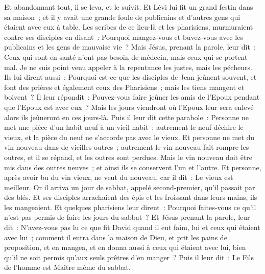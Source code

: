 \begin{multicols}{2}
Et abandonnant tout, il se leva, et le suivit.
Et Lévi lui fit un grand festin dans sa maison~; et il y avait une grande foule de publicains et d'autres gens qui étaient avec eux à table.
Les scribes de ce lieu-là et les pharisiens, murmuraient contre ses disciples en disant~: Pourquoi mangez-vous et buvez-vous avec les publicains et les gens de mauvaise vie~?
Mais Jésus, prenant la parole, leur dit~: Ceux qui sont en santé n'ont pas besoin de médecin, mais ceux qui se portent mal.
Je ne suis point venu appeler à la repentance les justes, mais les pécheurs.
Ils lui dirent aussi~: Pourquoi est-ce que les disciples de Jean jeûnent souvent, et font des prières et également ceux des Pharisiens~; mais les tiens mangent et boivent~?
Il leur répondit~: Pouvez-vous faire jeûner les amis de l'Epoux pendant que l'Epoux est avec eux~?
Mais les jours viendront où l'Epoux leur sera enlevé alors ils jeûneront en ces jours-là.
Puis il leur dit cette parabole~: Personne ne met une pièce d'un habit neuf à un vieil habit~; autrement le neuf déchire le vieux, et la pièce du neuf ne s'accorde pas avec le vieux.
Et personne ne met du vin nouveau dans de vieilles outres~; autrement le vin nouveau fait rompre les outres, et il se répand, et les outres sont perdues.
Mais le vin nouveau doit être mis dans des outres neuves~; et ainsi ils se conservent l'un et l'autre.
Et personne, après avoir bu du vin vieux, ne veut du nouveau, car il dit~: Le vieux est meilleur.
\VerseOne{}Or il arriva un jour de sabbat, appelé second-premier, qu'il passait par des blés. Et ses disciples arrachaient des épis et les froissant dans leurs mains, ils les mangeaient.
Et quelques pharisiens leur dirent~: Pourquoi faites-vous ce qu'il n'est pas permis de faire les jours du sabbat~?
Et Jésus prenant la parole, leur dit~: N'avez-vous pas lu ce que fit David quand il eut faim, lui et ceux qui étaient avec lui~;
comment il entra dans la maison de Dieu, et prit les pains de proposition, et en mangea, et en donna aussi à ceux qui étaient avec lui, bien qu'il ne soit permis qu'aux seuls prêtres d'en manger~?
Puis il leur dit~: Le Fils de l'homme est Maître même du sabbat.

\end{multicols}
